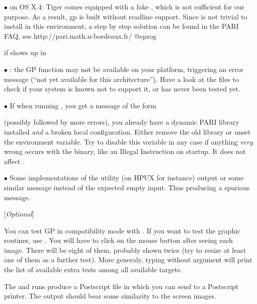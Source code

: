 $\bullet$ on OS X.4: Tiger comes equipped with a fake ,
which is not sufficient for our purpose. As a result, gp is built
without readline support. Since  is not trivial to install
in this environment, a step by step solution can be found in the PARI
FAQ, see
\bprog
  http://pari.math.u-bordeaux.fr/
@eprog


 if  shows up in 

$\bullet$ : the GP function  may not be available on
your platform, triggering an error message (``not yet available for this
architecture''). Have a look at the  files to check if your
system is known not to support it, or has never been tested yet.

$\bullet$ If when running , you get a message of the form


\noindent (possibly followed by more errors), you already have a dynamic PARI
library installed \emph{and} a broken local configuration. Either remove the
old library or unset the  environment variable. Try to
disable this variable in any case if anything \emph{very} wrong occurs with
the  binary, like an Illegal Instruction on startup. It does not
affect .

$\bullet$ Some implementations of the  utility (on HPUX for
instance) output  or some similar
message instead of the expected empty input. Thus producing a spurious
\kbd{[BUG]} message.

 [{\sl Optional\/}]

You can test GP in compatibility mode with . If you
want to test the graphic routines, use . You will
have to click on the mouse button after seeing each image. There will be
eight of them, probably shown twice (try to resize at least one of them
as a further test). More generaly, typing  without argument
will print the list of available extra tests among all available targets.

The  and  runs produce a Postscript
file  in  which you can send to a Postscript
printer. The output should bear some similarity to the screen images.

